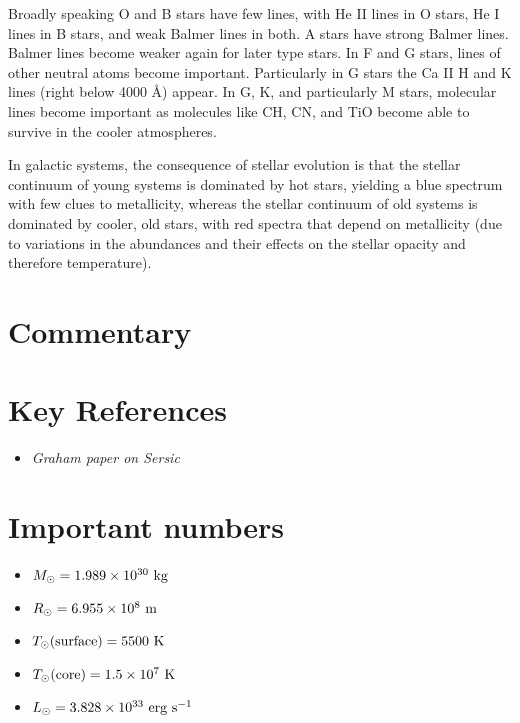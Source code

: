 Broadly speaking O and B stars have few lines, with He II lines in O
stars, He I lines in B stars, and weak Balmer lines in both. A stars
have strong Balmer lines. Balmer lines become weaker again for later
type stars. In F and G stars, lines of other neutral atoms become
important. Particularly in G stars the Ca II H and K lines (right
below 4000 \AA) appear. In G, K, and particularly M stars, molecular
lines become important as molecules like CH, CN, and TiO become able
to survive in the cooler atmospheres.

In galactic systems, the consequence of stellar evolution is that the
stellar continuum of young systems is dominated by hot stars, yielding
a blue spectrum with few clues to metallicity, whereas the stellar
continuum of old systems is dominated by cooler, old stars, with red
spectra that depend on metallicity (due to variations in the
abundances and their effects on the stellar opacity and therefore
temperature). 

\section{Commentary}

\section{Key References}

\begin{itemize}
  \item {\it Graham paper on Sersic}
\end{itemize}

\citet{gunn06a}

\section{Important numbers}

\begin{itemize}
\item $M_{\odot} = 1.989 \times 10^{30} {\rm ~kg} $
\item $R_{\odot} = 6.955 \times 10^{8} {\rm ~m} $
\item $T_{\odot}{\rm (surface)} = 5500 {\rm ~K} $
\item $T_{\odot}{\rm (core)} = 1.5 \times 10^7 {\rm ~K} $
\item $L_{\odot} = 3.828 \times 10^{33} {\rm ~erg} {\rm ~s}^{-1}$
\end{itemize}

